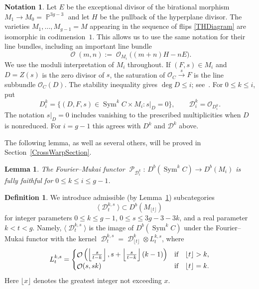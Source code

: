 \documentclass[11pt,letterpaper]{amsart}
\theoremstyle{plain}
\newtheorem{lemma}[theorem]{Lemma}
\theoremstyle{definition}
\newtheorem{definition}[theorem]{Definition}
\newtheorem{notation}[theorem]{Notation}
\theoremstyle{remark}
\numberwithin{equation}{section}
\DeclareMathOperator{\Sym}{Sym}
\DeclareMathOperator{\cD}{\mathcal{D}}
\DeclareMathOperator{\cO}{\mathcal{O}}
\DeclareMathOperator{\cP}{\mathcal{P}}
\DeclareMathOperator{\bP}{{\mathbb{P}}}
\newcommand{\ft}{{\lfloor t\rfloor}}
\begin{document}
 \begin{notation}\label{notation:stable-pairs}
Let $E$ be the exceptional divisor of the birational morphism $M_1\to M_0=\bP^{3g-3}$
and let $H$ be the pullback of the hyperplane divisor.
The varieties $M_1,\ldots,M_{g-1}=M$ appearing in the sequence of flips \eqref{THDiagram} are isomorphic in codimension~$1$.
This allows us to use the same notation for their line bundles, including an important line bundle
\cite{thaddeus}
\[
\cO(m,n):=\cO_{M_i}\bigl((m+n)H-nE\bigr).
\]
We use the moduli interpretation of $M_i$ throughout.  If $(F,s)\in M_i$
and $D=Z(s)$ is the zero divisor of $s$, the saturation of
$\mathcal O_C\xrightarrow{s}F$ is the line subbundle $\mathcal O_C(D)$.
The stability inequality gives $\deg D\le i$;
see~\cite[Definition~1.1 and Section~3]{thaddeus}.
For $0\le k\le i$, put
\[
 D_i^k=\{(D,F,s)\in\operatorname{Sym}^kC\times M_i:s|_D=0\},
 \qquad \mathcal D_i^k=\mathcal O_{D_i^k}.
\]
The notation $s|_D=0$ includes vanishing to the prescribed multiplicities
when $D$ is nonreduced.  For $i=g-1$ this agrees with $D^k$ and
$\mathcal D^k$ above.
\end{notation}



The following lemma, as well as several others, will be proved in Section~\ref{CrossWarpSection}.
\begin{lemma}\label{asgasrhare}
The Fourier--Mukai functor $\cP_{\cD_i^k}:\,D^b(\Sym^kC)\to D^b(M_i)$ is fully faithful for $0\le k\le i\le g-1$.
\end{lemma}






\begin{definition}
We introduce admissible (by Lemma~\ref{asgasrhare}) subcategories 
$$\langle\cD^{k,s}_t\rangle\subset D^b(M_\ft)$$ for 
integer parameters
$0\le k\le g-1$, $0\le s\le 3g-3-3k$, and a real parameter $k<t<g$. Namely, $\langle\cD^{k,s}_t\rangle$ is  
the image of $D^b(\Sym^k C)$
under
the Fourier--Mukai functor with the  kernel $\cD^{k,s}_t=\cD^k_\ft\otimes L^{k,s}_t$, where
\begin{equation}\label{wonderingblocks}
L^{k,s}_t=\begin{cases}
\cO\left(
\left\lfloor{s\over t-k}\right\rfloor, s+\left\lfloor{s\over t-k}\right\rfloor(k-1)\right)&\hbox{\rm if}\quad \ft>k,\cr
\cO(s,sk) &\hbox{\rm if}\quad \ft=k.\cr
\end{cases}
\end{equation}
Here $\lfloor x\rfloor$ denotes the greatest integer not exceeding $x$.
\end{definition}
\end{document}
